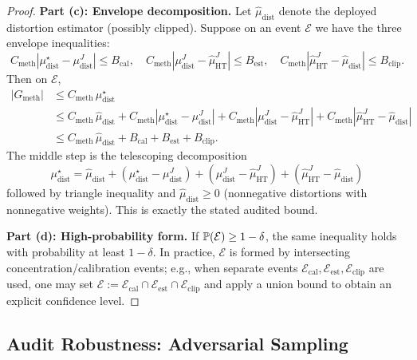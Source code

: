 \begin{proof}
\textbf{Part (c): Envelope decomposition.}
Let $\hat{\mu}_{\mathrm{dist}}$ denote the deployed distortion estimator (possibly clipped). Suppose on an event $\mathcal{E}$ we have the three envelope inequalities:
\[
C_{\mathrm{meth}}\!\left|\mu_{\mathrm{dist}}^{\star}-\mu_{\mathrm{dist}}^{J}\right|\le B_{\mathrm{cal}},\quad
C_{\mathrm{meth}}\!\left|\mu_{\mathrm{dist}}^{J}-\hat{\mu}_{\mathrm{HT}}^{J}\right|\le B_{\mathrm{est}},\quad
C_{\mathrm{meth}}\!\left|\hat{\mu}_{\mathrm{HT}}^{J}-\hat{\mu}_{\mathrm{dist}}\right|\le B_{\mathrm{clip}}.
\]
Then on $\mathcal{E}$,
\begin{align*}
|G_{\mathrm{meth}}|
&\le C_{\mathrm{meth}}\,\mu_{\mathrm{dist}}^{\star} \\
&\le C_{\mathrm{meth}}\,\hat{\mu}_{\mathrm{dist}}
 + C_{\mathrm{meth}}\!\left|\mu_{\mathrm{dist}}^{\star}-\mu_{\mathrm{dist}}^{J}\right|
 + C_{\mathrm{meth}}\!\left|\mu_{\mathrm{dist}}^{J}-\hat{\mu}_{\mathrm{HT}}^{J}\right|
 + C_{\mathrm{meth}}\!\left|\hat{\mu}_{\mathrm{HT}}^{J}-\hat{\mu}_{\mathrm{dist}}\right| \\
&\le C_{\mathrm{meth}}\,\hat{\mu}_{\mathrm{dist}} + B_{\mathrm{cal}} + B_{\mathrm{est}} + B_{\mathrm{clip}}.
\end{align*}
The middle step is the telescoping decomposition
\[
\mu_{\mathrm{dist}}^{\star}
=\hat{\mu}_{\mathrm{dist}}
+(\mu_{\mathrm{dist}}^{\star}-\mu_{\mathrm{dist}}^{J})
+(\mu_{\mathrm{dist}}^{J}-\hat{\mu}_{\mathrm{HT}}^{J})
+(\hat{\mu}_{\mathrm{HT}}^{J}-\hat{\mu}_{\mathrm{dist}})
\]
followed by triangle inequality and $\hat{\mu}_{\mathrm{dist}}\ge 0$ (nonnegative distortions with nonnegative weights). This is exactly the stated audited bound.

\textbf{Part (d): High-probability form.}
If $\mathbb{P}(\mathcal{E}) \ge 1-\delta$, the same inequality holds with probability at least $1-\delta$. In practice, $\mathcal{E}$ is formed by intersecting concentration/calibration events; e.g., when separate events $\mathcal{E}_{\mathrm{cal}},\mathcal{E}_{\mathrm{est}},\mathcal{E}_{\mathrm{clip}}$ are used, one may set $\mathcal{E}:=\mathcal{E}_{\mathrm{cal}}\cap\mathcal{E}_{\mathrm{est}}\cap\mathcal{E}_{\mathrm{clip}}$ and apply a union bound to obtain an explicit confidence level.
\end{proof}

\subsection{Audit Robustness: Adversarial Sampling}\label{app:audit-robustness}

